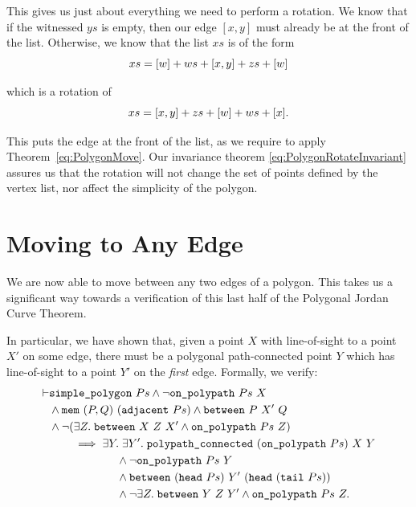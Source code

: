 This gives us just about everything we need to perform a rotation. We know that if the witnessed $ys$ is empty, then our edge $[x,y]$ must already be at the front of the list. Otherwise, we know that the list $xs$ is of the form
\begin{displaymath}
  xs = [w] + ws + [x,y] + zs + [w]
\end{displaymath}

which is a rotation of
\begin{displaymath}
  xs = [x,y] + zs + [w] + ws + [x].
\end{displaymath}

This puts the edge at the front of the list, as we require to apply Theorem~\ref{eq:PolygonMove}. Our invariance theorem \eqref{eq:PolygonRotateInvariant} assures us that the rotation will not change the set of points defined by the vertex list, nor affect the simplicity of the polygon.

\section{Moving to Any Edge}
We are now able to move between any two edges of a polygon. This takes us a significant way towards a verification of this last half of the Polygonal Jordan Curve Theorem. 

In particular, we have shown that, given a point $X$ with line-of-sight to a point $X'$ on some edge, there must be a polygonal path-connected point $Y$ which has line-of-sight to a point $Y'$ on the \emph{first} edge. Formally, we verify:
\begin{equation*}
  \begin{split}
\vdash    &\texttt{simple\_polygon}\ Ps \wedge \neg\texttt{on\_polypath}\ Ps\ X\\
    &\wedge \texttt{mem}\ (P,Q)\ (\texttt{adjacent}\ Ps) \wedge \texttt{between}\ P\ X'\ Q\\
    &\wedge\neg(\exists Z.\; \texttt{between}\ X\ Z\ X' \wedge \texttt{on\_polypath}\ Ps\ Z)\\
    &\qquad\implies \exists Y.\;\exists Y'.\; \texttt{polypath\_connected}\ (\texttt{on\_polypath}\ Ps)\ X\ Y\\
    &\qquad\qquad\qquad\wedge\neg\texttt{on\_polypath}\ Ps\ Y\\
    &\qquad\qquad\qquad\wedge \texttt{between}\ (\texttt{head}\ Ps)\ Y'\ (\texttt{head}\ (\texttt{tail}\ Ps))\\
    &\qquad\qquad\qquad\wedge \neg\exists Z.\; \texttt{between}\ Y\ Z\ Y' \wedge \texttt{on\_polypath}\ Ps\ Z.
  \end{split}
\end{equation*}

